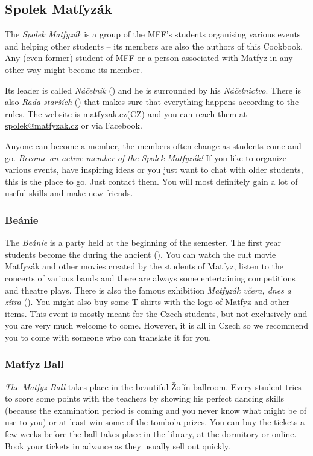 \subsection{Spolek Matfyzák}

The \textit{Spolek Matfyzák} is a group of the MFF’s students organising various
events and helping other students -- its members are also the authors of this
Cookbook. Any (even former) student of MFF or a person associated with Matfyz in
any other way might become its member.

Its leader is called \textit{Náčelník} () and he is surrounded by his
\textit{Náčelnictvo}. There is also \textit{Rada starších} () that makes sure that everything happens according to the rules.
The website is \url{matfyzak.cz}(CZ) and you can reach them at
\url{spolek@matfyzak.cz} or via Facebook.

Anyone can become a member, the members often change as students come and go.
\textit{Become an active member of the Spolek Matfyzák!} If you like to organize
various events, have inspiring ideas or you just want to chat with older
students, this is the place to go. Just contact them. You will most definitely
gain a lot of useful skills and make new friends.


\subsubsection{Beánie}
The \textit{Beánie} is a party held at the beginning of the semester.
The first year students become the  during the
ancient  ().
You can watch the cult movie Matfyzák and other movies created by the students
of Matfyz, listen to the concerts of various bands and there are always some
entertaining competitions and theatre plays. There is also the famous exhibition
\textit{Matfyzák včera, dnes a zítra} (). You might also buy some T-shirts with the logo of Matfyz and
other items.
This event is mostly meant for the Czech students, but not exclusively and you
are very much welcome to come. However, it is all in Czech so we recommend you
to come with someone who can translate it for you.


\subsubsection{Matfyz Ball}
\textit{The Matfyz Ball} takes place in the beautiful Žofín ballroom. Every
student tries to score some points with the teachers by showing his perfect
dancing skills (because the examination period is coming and you never know what
might be of use to you) or at least win some of the tombola prizes.
You can buy the tickets a few weeks before the ball takes place in the library,
at the dormitory or online. Book your tickets in advance as they usually sell
out quickly.


